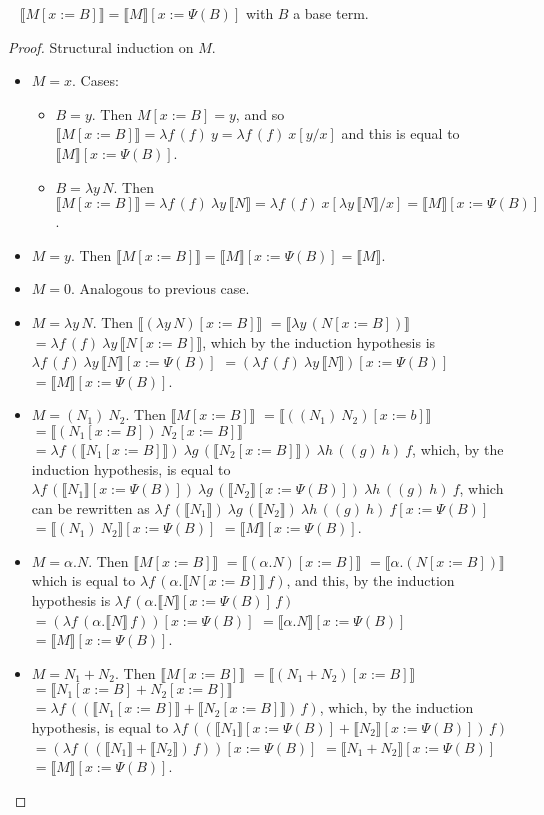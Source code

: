 \documentclass{LMCS}
\newcommand{\recap}[2]{\medskip\noindent{\bf #1 \ref{#2}.}~}
\newcommand{\wt}[1]{\llbracket{#1}\rrbracket}
\newcommand{\cont}[1]{\lambda f\,\left(f\right)~#1}
\newcommand{\uncont}[2]{\lambda #1\,({#2}\,#1)}
\newcommand{\tapp}[5]{\lambda{#1}\,({#4})~\lambda{#2}\,({#5})~\lambda{#3}\,(({#2})~{#3})~{#1}}
\newcommand{\tappfgh}{\tapp{f}{g}{h}}
\begin{document}
\recap{Lemma}{lem:substitution2}
$\wt{M[x:=B]}=\wt{M}[x:=\Psi(B)]$ with $B$ a base term.
\begin{proof}
  Structural induction on $M$.
  \begin{itemize}
    \item $M=x$. Cases:
      \begin{itemize}
	\item $B=y$. Then $M[x:=B]=y$, and so $\wt{M[x:=B]}=\cont{y}=\cont{x}[y/x]$ and this is equal to $\wt{M}[x:=\Psi(B)]$.
	\item $B=\lambda y\,N$. Then $\wt{M[x:=B]}=\cont{\lambda y\,\wt{N}}=\cont{x}[\lambda y\,\wt{N}/x]=\wt{M}[x:=\Psi(B)]$.
      \end{itemize}
    \item $M=y$. Then $\wt{M[x:=B]}=\wt{M}[x:=\Psi(B)]=\wt{M}$.
    \item $M=0$. Analogous to previous case.
    \item $M=\lambda y\,N$. Then 
      $\wt{(\lambda y\,N)[x:=B]}$
      $=\wt{\lambda y\,(N[x:=B])}$
      $=\cont{\lambda y\,\wt{N[x:=B]}}$, 
      which by the induction hypothesis is 
      $\cont{\lambda y\,\wt{N}[x:=\Psi(B)]}$
      $=(\cont{\lambda y\,\wt{N}})[x:=\Psi(B)]$
      $=\wt{M}[x:=\Psi(B)]$.
    \item $M=(N_1)\ N_2$. Then
      $\wt{M[x:=B]}$
      \!$=\!\wt{((N_1)~N_2)[x:=b]}$
      \!$=\!\wt{(N_1[x:=B])~N_2[x:=B]}$
      $=\tappfgh{\wt{N_1[x:=B]}}{\wt{N_2[x:=B]}}$,
      which, by the induction hypothesis, is equal to
      $\tappfgh{\wt{N_1}[x:=\Psi(B)]}{\wt{N_2}[x:=\Psi(B)]}$,
      which can be rewritten as
      $\tappfgh{\wt{N_1}}{\wt{N_2}}[x:=\Psi(B)]$
      $=\wt{(N_1)~N_2}[x:=\Psi(B)]$
      $=\wt{M}[x:=\Psi(B)]$.
    \item $M=\alpha.N$. Then 
      $\wt{M[x:=B]}$
      $=\wt{(\alpha.N)[x:=B]}$
      $=\wt{\alpha.(N[x:=B])}$
      which is equal to
      $\uncont{f}{\alpha.\wt{N[x:=B]}}$,
      and this, by the induction hypothesis is
      $\uncont{f}{\alpha.\wt{N}[x:=\Psi(B)]}$
      $=(\uncont{f}{\alpha.\wt{N}})[x:=\Psi(B)]$
      $=\wt{\alpha.N}[x:=\Psi(B)]$
      $=\wt{M}[x:=\Psi(B)]$.
    \item $M=N_1+N_2$. Then 
      $\wt{M[x:=\!B]}$
      \!$=\!\wt{(N_1+N_2)[x:=\!B]}$
      \!$=\!\wt{N_1[x:=B]+N_2[x:=B]}$
      $=\uncont{f}{(\wt{N_1[x:=B]}+\wt{N_2[x:=B]})}$,
      which, by the induction hypothesis, is equal to
      $\uncont{f}{(\wt{N_1}[x:=\Psi(B)]+\wt{N_2}[x:=\Psi(B)])}$
      \!$=(\uncont{f}{(\wt{N_1}+\wt{N_2})})[x:=\Psi(B)]$
      $=\wt{N_1+N_2}[x:=\Psi(B)]$
      $=\wt{M}[x:=\Psi(B)]$.
      \qedhere
  \end{itemize}
\end{proof}
\end{document}
